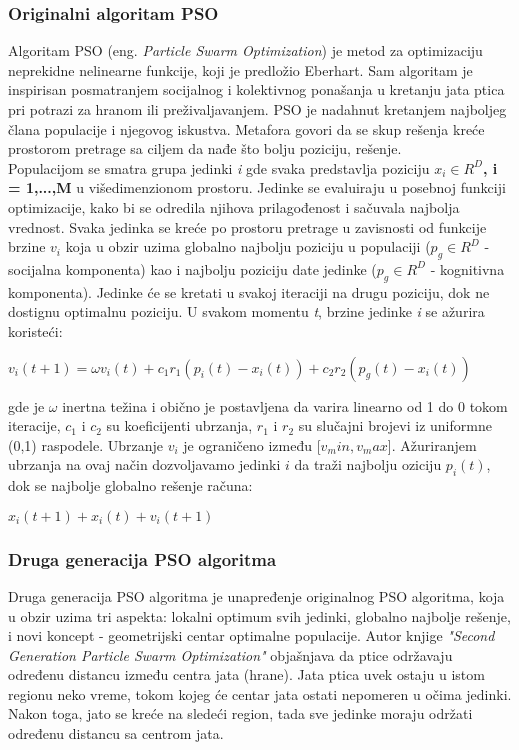 \documentclass[a4paper]{article}
\begin{document}
{\subsubsection{Originalni algoritam PSO}
\label{subsubsec:opso}
Algoritam PSO (eng. \textit{Particle Swarm Optimization}) je metod za optimizaciju neprekidne nelinearne funkcije, koji je predložio Eberhart.
Sam algoritam je inspirisan posmatranjem socijalnog i kolektivnog ponašanja u kretanju jata ptica pri potrazi za hranom ili preživaljavanjem.
PSO je nadahnut kretanjem najboljeg člana populacije i njegovog iskustva. Metafora govori da se skup rešenja kreće prostorom pretrage sa ciljem da nađe što bolju poziciju, rešenje. \cite{hindawi}
\\
Populacijom se smatra grupa jedinki \textit{i} gde svaka predstavlja poziciju \textbf{\textbf{$x_i \in R^D$, i = 1,...,M}} u višedimenzionom prostoru.
Jedinke se evaluiraju u posebnoj funkciji optimizacije, kako bi se odredila njihova prilagođenost i sačuvala najbolja vrednost. Svaka jedinka se kreće po
prostoru pretrage u zavisnosti od funkcije brzine \textbf{$v_i$} koja u obzir uzima globalno najbolju poziciju u populaciji ($p_g \in R^D$ - socijalna
komponenta) kao i najbolju poziciju date jedinke ($p_g \in R^D$ - kognitivna komponenta). Jedinke će se kretati u svakoj iteraciji na drugu poziciju,
dok ne dostignu optimalnu poziciju. U svakom momentu \textit{t}, brzine jedinke \textit{i} se ažurira koristeći: 
\begin{center}
\textbf\textit{$v_i(t+1) = \omega v_i(t) + c_1 r_1(p_i (t) - x_i (t)) + c_2 r_2 (p_g (t) - x_i (t))$}
\end{center}
gde je $\omega$ inertna težina i obično je postavljena da varira linearno od 1 do 0 tokom iteracije, $c_1$ i $c_2$ su koeficijenti ubrzanja, $r_1$ i $r_2$
su slučajni brojevi iz uniformne (0,1) raspodele. Ubrzanje \textbf{$v_i$} je ograničeno između [$v_min, v_max$]. Ažuriranjem ubrzanja na ovaj 
način dozvoljavamo jedinki $i$ da traži najbolju oziciju \textbf{$p_i(t)$}, dok se najbolje globalno rešenje računa:\cite{hindawi}
\begin{center}
\textbf\textit{$x_i(t+1) + x_i(t) + v_i(t+1)$}
\end{center} 

\subsubsection{Druga generacija PSO algoritma}
\label{subsubsec:sgpso}
Druga generacija PSO algoritma je unapređenje originalnog PSO algoritma, koja u obzir uzima tri aspekta: lokalni optimum svih jedinki,
globalno najbolje rešenje, i novi koncept - geometrijski centar optimalne populacije. Autor knjige \textit{"{}Second Generation Particle Swarm Optimization"} objašnjava da ptice održavaju 
određenu distancu između centra jata (hrane). Jata ptica uvek ostaju u istom regionu neko vreme, tokom kojeg će centar jata ostati
nepomeren u očima jedinki. Nakon toga, jato se kreće na sledeći region, tada sve jedinke moraju održati određenu distancu sa centrom jata.

}
\end{document}
